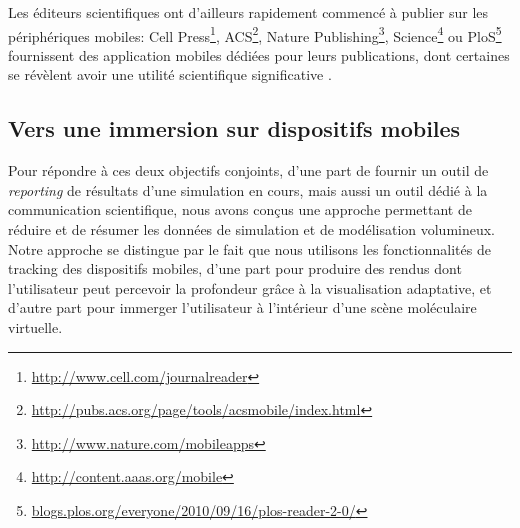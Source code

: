 
Les éditeurs scientifiques ont d'ailleurs rapidement commencé à publier sur les périphériques mobiles: Cell Press\footnote{\url{http://www.cell.com/journalreader}}, ACS\footnote{\url{http://pubs.acs.org/page/tools/acsmobile/index.html}}, Nature Publishing\footnote{\url{http://www.nature.com/mobileapps}}, Science\footnote{\url{http://content.aaas.org/mobile}} ou PloS\footnote{\url{blogs.plos.org/everyone/2010/09/16/plos-reader-2-0/}} fournissent des application mobiles dédiées pour leurs publications, dont certaines se révèlent avoir une utilité scientifique significative \cite{powell_lab_2012}. %

\subsection{Vers une immersion sur dispositifs mobiles}

Pour répondre à ces deux objectifs conjoints, d'une part de fournir un outil de \textit{reporting} de résultats d'une simulation en cours, mais aussi un outil dédié à la communication scientifique, nous avons conçus une approche permettant de réduire et de résumer les données de simulation et de modélisation volumineux. Notre approche se distingue par le fait que nous utilisons les fonctionnalités de tracking des dispositifs mobiles, d'une part pour produire des rendus dont l'utilisateur peut percevoir la profondeur grâce à la visualisation adaptative, et d'autre part pour immerger  l'utilisateur à l'intérieur d'une scène moléculaire virtuelle.

